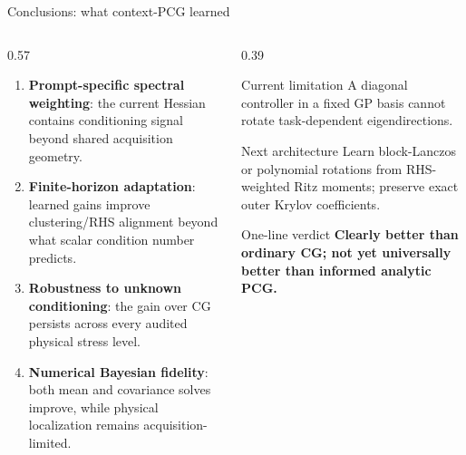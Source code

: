 \documentclass[aspectratio=169,10pt]{beamer}
\begin{document}
\begin{frame}{Conclusions: what context-PCG learned}
\small
\begin{columns}[T,onlytextwidth]
\begin{column}{0.57\textwidth}
  \begin{enumerate}\setlength\itemsep{0.25em}
    \item \textbf{Prompt-specific spectral weighting}: the current Hessian contains conditioning signal beyond shared acquisition geometry.
    \item \textbf{Finite-horizon adaptation}: learned gains improve clustering/RHS alignment beyond what scalar condition number predicts.
    \item \textbf{Robustness to unknown conditioning}: the gain over CG persists across every audited physical stress level.
    \item \textbf{Numerical Bayesian fidelity}: both mean and covariance solves improve, while physical localization remains acquisition-limited.
  \end{enumerate}
\end{column}
\begin{column}{0.39\textwidth}
  \begin{alertblock}{Current limitation}
  A diagonal controller in a fixed GP basis cannot rotate task-dependent eigendirections.
  \end{alertblock}
  \begin{block}{Next architecture}
  Learn block-Lanczos or polynomial rotations from RHS-weighted Ritz moments; preserve exact outer Krylov coefficients.
  \end{block}
  \begin{block}{One-line verdict}
  \textbf{Clearly better than ordinary CG; not yet universally better than informed analytic PCG.}
  \end{block}
\end{column}
\end{columns}
\end{frame}
\end{document}
